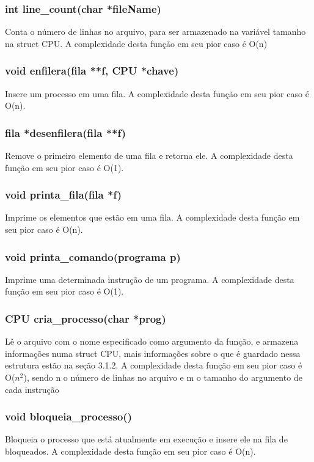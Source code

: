 \documentclass[a4paper, 12pt]{article}
\begin{document}
 \subsubsection{int line\_count(char *fileName)}
    Conta o número de linhas no arquivo, para ser armazenado na variável tamanho na struct CPU. A complexidade desta função em seu pior caso é O(n)
    
 \subsubsection{void enfilera(fila **f, CPU *chave)}
    Insere um processo em uma fila. A complexidade desta função em seu pior caso é O(n).
    
 \subsubsection{fila *desenfilera(fila **f)}
    Remove o primeiro elemento de uma fila e retorna ele. A complexidade desta função em seu pior caso é O(1).
    
 \subsubsection{void printa\_fila(fila *f)}
    Imprime os elementos que estão em uma fila. A complexidade desta função em seu pior caso é O(n).
    
 \subsubsection{void printa\_comando(programa p)}
    Imprime uma determinada instrução de um programa. A complexidade desta função em seu pior caso é O(1).
    
 \subsubsection{CPU cria\_processo(char *prog)}
    Lê o arquivo com o nome especificado como argumento da função, e armazena informações numa struct CPU, mais informações sobre o que é guardado nessa estrutura estão na seção 3.1.2. A complexidade desta função em seu pior caso é O($n^2$), sendo n o número de linhas no arquivo e m o tamanho do argumento de cada instrução
    
 \subsubsection{void bloqueia\_processo()}
    Bloqueia o processo que está atualmente em execução e insere ele na fila de bloqueados. A complexidade desta função em seu pior caso é O(n).
    
\end{document}
